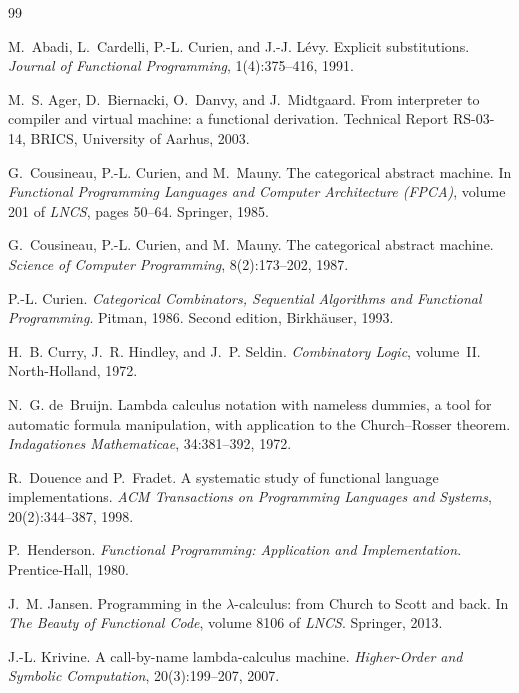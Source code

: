\documentclass[11pt,a4paper]{article}
\theoremstyle{definition}
\theoremstyle{plain}
\begin{document}
\begin{thebibliography}{99}
\small

M.~Abadi, L.~Cardelli, P.-L. Curien, and J.-J. Lévy.
\newblock Explicit substitutions.
\newblock \emph{Journal of Functional Programming}, 1(4):375--416, 1991.

M.~S. Ager, D.~Biernacki, O.~Danvy, and J.~Midtgaard.
\newblock From interpreter to compiler and virtual machine: a functional
  derivation.
\newblock Technical Report RS-03-14, BRICS, University of Aarhus, 2003.

G.~Cousineau, P.-L. Curien, and M.~Mauny.
\newblock The categorical abstract machine.
\newblock In \emph{Functional Programming Languages and Computer Architecture
  (FPCA)}, volume 201 of \emph{LNCS}, pages 50--64. Springer, 1985.

G.~Cousineau, P.-L. Curien, and M.~Mauny.
\newblock The categorical abstract machine.
\newblock \emph{Science of Computer Programming}, 8(2):173--202, 1987.

P.-L. Curien.
\newblock \emph{Categorical Combinators, Sequential Algorithms and Functional
  Programming}.
\newblock Pitman, 1986. Second edition, Birkhäuser, 1993.

H.~B. Curry, J.~R. Hindley, and J.~P. Seldin.
\newblock \emph{Combinatory Logic}, volume~II.
\newblock North-Holland, 1972.

N.~G. de~Bruijn.
\newblock Lambda calculus notation with nameless dummies, a tool for automatic
  formula manipulation, with application to the {C}hurch--{R}osser theorem.
\newblock \emph{Indagationes Mathematicae}, 34:381--392, 1972.

R.~Douence and P.~Fradet.
\newblock A systematic study of functional language implementations.
\newblock \emph{ACM Transactions on Programming Languages and Systems},
  20(2):344--387, 1998.

P.~Henderson.
\newblock \emph{Functional Programming: Application and Implementation}.
\newblock Prentice-Hall, 1980.

J.~M. Jansen.
\newblock Programming in the $\lambda$-calculus: from {C}hurch to {S}cott and
  back.
\newblock In \emph{The Beauty of Functional Code}, volume 8106 of
  \emph{LNCS}. Springer, 2013.

J.-L. Krivine.
\newblock A call-by-name lambda-calculus machine.
\newblock \emph{Higher-Order and Symbolic Computation}, 20(3):199--207, 2007.


\end{thebibliography}
\end{document}

